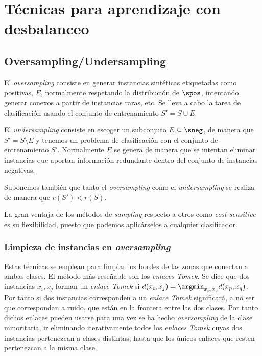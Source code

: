 
\section{Técnicas para aprendizaje con desbalanceo}
\subsection{Oversampling/Undersampling}
El \textit{oversampling} consiste en generar instancias sintéticas etiquetadas como positivas, $E$, normalmente 
respetando la distribución de $\spos$, intentando generar conexos a partir de instancias raras, etc. Se lleva a cabo la 
tarea de clasificación usando el conjunto de entrenamiento $S' = S\cup E$. 

El \textit{undersampling} consiste en escoger un subconjuto $E \subseteq \sneg$, de manera que $S' = S\setminus E$ 
y tenemos un problema de clasificación con el conjunto de entrenamiento $S'$. Normalmente $E$ se genera de manera que se
intentan eliminar instancias que aportan información redundante dentro del conjunto de instancias negativas.

Suponemos también que tanto el \textit{oversampling} como el \textit{undersampling} se realiza de manera que $r(S') < r(S)$.

La gran ventaja de los métodos de \textit{sampling} respecto a otros como \textit{cost-sensitive} es su flexibilidad, puesto
que podemos aplicárselos a cualquier clasificador.

\subsubsection{Limpieza de instancias en \textit{oversampling}}

Estas técnicas se emplean para limpiar los bordes de las zonas que conectan a ambas clases. El método más reseñable son los
\textit{enlaces Tomek}. Se dice que dos instancias $x_i, x_j$ forman un \textit{enlace Tomek} si 
$d(x_i, x_j) = \argmin_{x_p, x_q} d(x_p, x_q)$. Por tanto si dos instancias corresponden a un \textit{enlace Tomek} significará,
a no ser que correspondan a ruido, que están en la frontera entre las dos clases. Por tanto dichos enlaces pueden usarse para
una vez se ha hecho \textit{oversampling} de la clase minoritaria, ir eliminando iterativamente todos los \textit{enlaces Tomek}
cuyas dos instancias pertenezcan a clases distintas, hasta que los únicos enlaces que resten pertenezcan a la misma clase.

